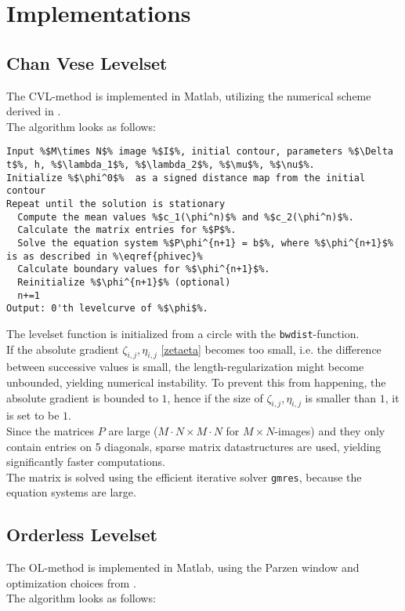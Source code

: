 \chapter{Implementations}\label{AppendixB} %

\section{Chan Vese Levelset}
The CVL-method is implemented in Matlab, utilizing the numerical scheme derived in .\\
The algorithm looks as follows:\\

\begin{lstlisting}
Input %$M\times N$% image %$I$%, initial contour, parameters %$\Delta t$%, h, %$\lambda_1$%, %$\lambda_2$%, %$\mu$%, %$\nu$%.
Initialize %$\phi^0$%  as a signed distance map from the initial contour
Repeat until the solution is stationary
  Compute the mean values %$c_1(\phi^n)$% and %$c_2(\phi^n)$%.
  Calculate the matrix entries for %$P$%.
  Solve the equation system %$P\phi^{n+1} = b$%, where %$\phi^{n+1}$% is as described in %\eqref{phivec}%
  Calculate boundary values for %$\phi^{n+1}$%.
  Reinitialize %$\phi^{n+1}$% (optional)
  n+=1
Output: 0'th levelcurve of %$\phi$%.
\end{lstlisting}

The levelset function is initialized from a circle with the \texttt{bwdist}-function.\\
If the absolute gradient $\zeta_{i,j}, \eta_{i,j}$ \eqref{zetaeta} becomes too small, i.e. the difference between successive values is small, the length-regularization might become unbounded, yielding numerical instability. To prevent this from happening, the absolute gradient is bounded to $1$, hence if the size of $\zeta_{i,j}, \eta_{i,j}$ is smaller than $1$, it is set to be $1$.\\
Since the matrices $P$ are large ($M\cdot N\times M\cdot N$ for $M\times N$-images) and they only contain entries on 5 diagonals, sparse matrix datastructures are used, yielding significantly faster computations.\\
The matrix is solved using the efficient iterative solver \texttt{gmres}, because the equation systems are large.


\section{Orderless Levelset}
The OL-method is implemented in Matlab, using the Parzen window and optimization choices from .\\
The algorithm looks as follows:\\

